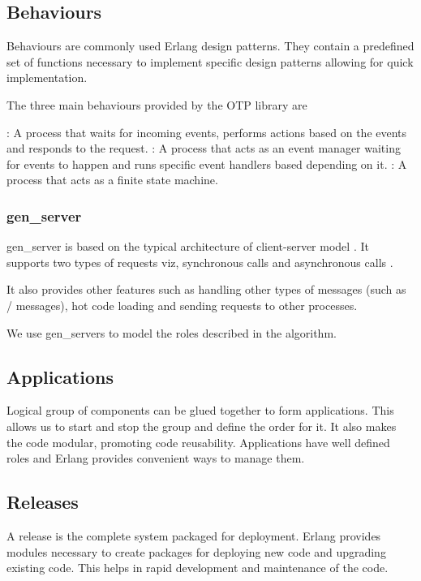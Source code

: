 \subsection{Behaviours}
\label{section:concepts.behaviours}
Behaviours are commonly used Erlang design patterns. They contain a predefined
set of functions necessary to implement specific design patterns allowing for
quick implementation.

The three main behaviours provided by the OTP library are

\begin{itemize}
    : A process that waits for incoming events, performs
    actions based on the events and responds to the request.
    : A process that acts as an event manager waiting for
    events to happen and runs specific event handlers based depending on it.
    : A process that acts as a finite state machine.
\end{itemize}

\subsubsection{gen\_server}
\label{section:gen.server}

gen\_server is based on the typical architecture of client-server model
\citep{reliable.dist.sys}. It supports two types of requests viz, synchronous
calls%
and asynchronous calls%
.

It also provides other features such as handling other types of messages (such
as / messages), hot code loading and sending requests to
other processes.

We use gen\_servers to model the roles described in the algorithm.

\subsection{Applications}
\label{section:concepts.applications}
Logical group of components can be glued together to form applications.
This allows us to start and stop the group and define the order for it. It also
makes the code modular, promoting code reusability. Applications have 
well defined roles and Erlang provides convenient ways to
manage them.

\subsection{Releases}
\label{section:concepts.releases}
A release is the complete system packaged for deployment. Erlang provides 
modules necessary to create packages for deploying new code and upgrading
existing code. This helps in rapid development and maintenance of the code.

